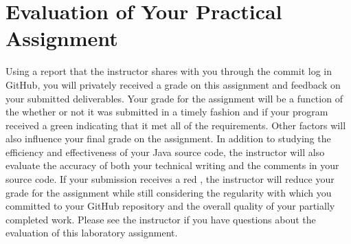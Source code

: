 \documentclass[11pt]{article}
\newcommand{\checkmark}{\ding{51}}
\newcommand{\naughtmark}{\ding{55}}
\begin{document}
\section*{Evaluation of Your Practical Assignment}

Using a report that the instructor shares with you through the commit log in GitHub, you will privately received a grade
on this assignment and feedback on your submitted deliverables. Your grade for the assignment will be a function of the
whether or not it was submitted in a timely fashion and if your program received a green \checkmark{} indicating that it
met all of the requirements. Other factors will also influence your final grade on the assignment. In addition to
studying the efficiency and effectiveness of your Java source code, the instructor will also evaluate the accuracy of
both your technical writing and the comments in your source code. If your submission receives a red \naughtmark{}, the
instructor will reduce your grade for the assignment while still considering the regularity with which you committed to
your GitHub repository and the overall quality of your partially completed work. Please see the instructor if you have
questions about the evaluation of this laboratory assignment.


\end{document}
